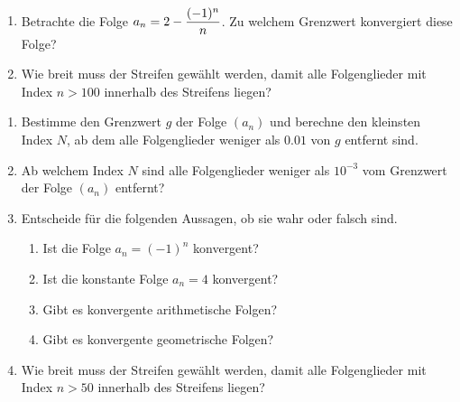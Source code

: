 \documentclass[11pt,oneside]{article}
\begin{document}
	\begin{beispiel}\ \\[-14pt]
		\begin{enumerate}[label=\alph*)]
			\item Betrachte die Folge $\displaystyle a_n=2-\frac{(-1)^n}{n}$. Zu welchem Grenzwert konvergiert diese Folge?
			\item Wie breit muss der Streifen gewählt werden, damit alle Folgenglieder mit Index $n>100$ innerhalb des Streifens liegen?
		\end{enumerate}
	\end{beispiel}
	\begin{aufgabe}
		\begin{enumerate}
			\item Bestimme den Grenzwert $g$ der Folge $(a_n)$ und berechne den kleinsten Index $N$, ab dem alle Folgenglieder weniger als $0.01$ von $g$ entfernt sind.
			\item Ab welchem Index $N$ sind alle Folgenglieder weniger als $10^{-3}$ vom Grenzwert der Folge $(a_n)$ entfernt?
			\item Entscheide für die folgenden Aussagen, ob sie wahr oder falsch sind.
			\begin{enumerate}[label=\alph*)]
				\item Ist die Folge $a_n=(-1)^n$ konvergent?
				\item Ist die konstante Folge $a_n=4$ konvergent?
				\item Gibt es konvergente arithmetische Folgen?
				\item Gibt es konvergente geometrische Folgen?
			\end{enumerate}
			\item Wie breit muss der Streifen gewählt werden, damit alle Folgenglieder mit Index $n>50$ innerhalb des Streifens liegen?
		\end{enumerate}
	\end{aufgabe}\newpage
\end{document}
